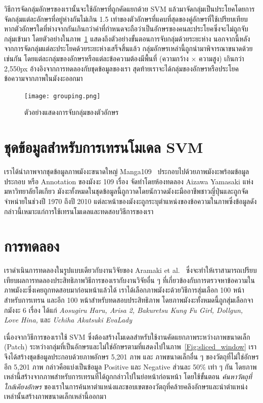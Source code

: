 วิธีการจัดกลุ่มอักษรของเรานั้นจะใช้อักษรที่ถูกคัดแยกด้วย SVM แล้วมาจัดกลุ่มเป็นประโยคโดยการจัดกลุ่มแต่ละอักษรที่อยู่ห่างกันไม่เกิน 1.5 เท่าของตัวอักษรที่แคบที่สุดของคู่อักษรที่ใช้เปรียบเทียบ หากตัวอักษรใดที่ห่างจากกันเกินกว่าค่าที่กำหนดจะถือว่าเป็นอักษรของคนละประโยคซึ่งจะไม่ถูกจับกลุ่มเข้ามา โดยตัวอย่างในภาพ~\ref{Fig:grouping} แสดงถึงตัวอย่างขั้นตอนการจับกลุ่มด้วยระยะห่าง นอกจากนี้หลังจากการจัดกลุ่มแต่ละประโยคด้วยระยะห่างเสร็จสิ้นแล้ว กลุ่มอักษรเหล่านี้ถูกนำมาพิจารณาขนาดด้วยเช่นกัน โดยแต่ละกลุ่มของอักษรหรือแต่ละข้อความต้องมีพื้นที่ (ความกว้าง $\times$ ความสูง) เกินกว่า 2,550px อ้างอิงจากการทดลองกับชุดข้อมูลของเรา สุดท้ายเราจะได้กลุ่มของอักษรหรือประโยคข้อความจากภาพในมังงะออกมา

\begin{figure}[!t]
    \centering
    \texttt{[image: grouping.png]}
    \caption{ตัวอย่างแสดงการจับกลุ่มของตัวอักษร}
    \label{Fig:grouping}
\end{figure}

\section{ชุดข้อมูลสำหรับการเทรนโมเดล SVM}

เราได้นำภาพจากชุดข้อมูลภาพมังงะขนาดใหญ่ Manga109~\cite{Matsui2017} ประกอบไปด้วยภาพมังงะพร้อมข้อมูลประกอบ หรือ Annotation ของมังงะ 109 เรื่อง จัดทำโดยห้องทดลอง Aizawa Yamasaki แห่งมหาวิทยาลัยโตเกียว มังงะทั้งหมดในชุดข้อมูลนี้ถูกวาดโดยนักวาดมังงะมืออาชีพชาวญี่ปุ่นและถูกจัดจำหน่ายในช่วงปี 1970 ถึงปี 2010 แต่ละหน้าของมังงะถูกระบุตำแหน่งของข้อความในภาพซึ่งข้อมูลดังกล่าวนี้เหมาะแก่การใช้เทรนโมเดลและทดสอบวิธีการของเรา

\section{การทดลอง}

เราดำเนินการทดลองในรูปแบบเดียวกับงานวิจัยของ Aramaki et al.~\cite{7532890} ซึ่งจะทำให้เราสามารถเปรียบเทียบผลการทดลองประสิทธิภาพวิธีการของเรากับงานวิจัยอื่น ๆ ที่เกี่ยวข้องกับการตรวจหาข้อความในภาพมังงะซึ่งเคยถูกทดสอบมาก่อนหน้าแล้วได้ เราได้เลือกภาพมังงะด้วยวิธีการสุ่มเลือก 100 หน้าสำหรับการเทรน และอีก 100 หน้าสำหรับทดสอบประสิทธิภาพ โดยภาพมังงะทั้งหมดนี้ถูกสุ่มเลือกจากมังงะ 6 เรื่อง ได้แก่ \textit{Aosugiru Haru, Arisa 2, Bakuretsu Kung Fu Girl, Dollgun, Love Hina,} และ \textit{Uchiha Akatsuki EvaLady}

เนื่องจากวิธีการของเราใช้ SVM ซึ่งต้องสร้างโมเดลสำหรับใช้งานคัดแยกภาพระหว่างภาพขนาดเล็ก (Patch) ระหว่างกลุ่มที่เป็นอักษรและไม่ใช่อักษรตามที่แสดงไปในภาพ~\ref{Fig:sliced_window} เราจึงได้สร้างชุดข้อมูลประกอบด้วยภาพอักษร 5,201 ภาพ และ ภาพขนาดเล็กอื่น ๆ ของวัตถุที่ไม่ใช่อักษรอีก 5,201 ภาพ กล่าวคือแบ่งเป็นข้อมูล Positive และ Negative ส่วนละ 50\% เท่า ๆ กัน โดยภาพเหล่านี้สร้างจากภาพสำหรับการเทรนที่ได้ถูกกล่าวไปในย่อหน้าก่อนหน้า โดยใช้ขั้นตอน \textit{ค้นหาวัตถุที่ใกล้เคียงอักษร} ของเราในการค้นหาตำแหน่งและขอบเขตของวัตถุที่คล้ายคลึงอักษรและนำตำแหน่งเหล่านั้นสร้างภาพขนาดเล็กเหล่านี้ออกมา

